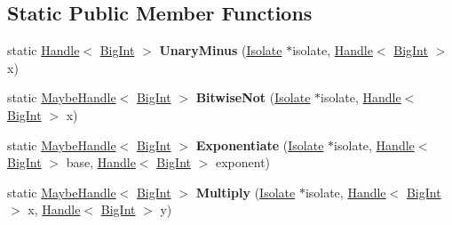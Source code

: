 \subsection*{Static Public Member Functions}
\begin{DoxyCompactItemize}
\item 
\mbox{\label{classv8_1_1internal_1_1BigInt_ab9b3c6eefd7d6def6ee31e1db26bd505}} 
static \mbox{\hyperlink{classv8_1_1internal_1_1Handle}{Handle}}$<$ \mbox{\hyperlink{classv8_1_1internal_1_1BigInt}{Big\+Int}} $>$ {\bfseries Unary\+Minus} (\mbox{\hyperlink{classv8_1_1internal_1_1Isolate}{Isolate}} $\ast$isolate, \mbox{\hyperlink{classv8_1_1internal_1_1Handle}{Handle}}$<$ \mbox{\hyperlink{classv8_1_1internal_1_1BigInt}{Big\+Int}} $>$ x)
\item 
\mbox{\label{classv8_1_1internal_1_1BigInt_a4ba27849e7a620587856f0ea2547a8b5}} 
static \mbox{\hyperlink{classv8_1_1internal_1_1MaybeHandle}{Maybe\+Handle}}$<$ \mbox{\hyperlink{classv8_1_1internal_1_1BigInt}{Big\+Int}} $>$ {\bfseries Bitwise\+Not} (\mbox{\hyperlink{classv8_1_1internal_1_1Isolate}{Isolate}} $\ast$isolate, \mbox{\hyperlink{classv8_1_1internal_1_1Handle}{Handle}}$<$ \mbox{\hyperlink{classv8_1_1internal_1_1BigInt}{Big\+Int}} $>$ x)
\item 
\mbox{\label{classv8_1_1internal_1_1BigInt_a6b08b4c1e80fec1f561f62d8a71e4242}} 
static \mbox{\hyperlink{classv8_1_1internal_1_1MaybeHandle}{Maybe\+Handle}}$<$ \mbox{\hyperlink{classv8_1_1internal_1_1BigInt}{Big\+Int}} $>$ {\bfseries Exponentiate} (\mbox{\hyperlink{classv8_1_1internal_1_1Isolate}{Isolate}} $\ast$isolate, \mbox{\hyperlink{classv8_1_1internal_1_1Handle}{Handle}}$<$ \mbox{\hyperlink{classv8_1_1internal_1_1BigInt}{Big\+Int}} $>$ base, \mbox{\hyperlink{classv8_1_1internal_1_1Handle}{Handle}}$<$ \mbox{\hyperlink{classv8_1_1internal_1_1BigInt}{Big\+Int}} $>$ exponent)
\item 
\mbox{\label{classv8_1_1internal_1_1BigInt_a373a079bfadcc7756dfdfe0a9371e016}} 
static \mbox{\hyperlink{classv8_1_1internal_1_1MaybeHandle}{Maybe\+Handle}}$<$ \mbox{\hyperlink{classv8_1_1internal_1_1BigInt}{Big\+Int}} $>$ {\bfseries Multiply} (\mbox{\hyperlink{classv8_1_1internal_1_1Isolate}{Isolate}} $\ast$isolate, \mbox{\hyperlink{classv8_1_1internal_1_1Handle}{Handle}}$<$ \mbox{\hyperlink{classv8_1_1internal_1_1BigInt}{Big\+Int}} $>$ x, \mbox{\hyperlink{classv8_1_1internal_1_1Handle}{Handle}}$<$ \mbox{\hyperlink{classv8_1_1internal_1_1BigInt}{Big\+Int}} $>$ y)

\end{DoxyCompactItemize}
